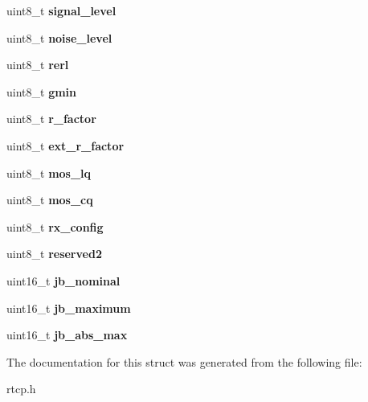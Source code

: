 \begin{DoxyCompactItemize}
\mbox{\label{structrtcp__xr__voip__metrics__report__block_a40740f7487e9b9ba71d17bf6ab461df1}} 
uint8\+\_\+t {\bfseries signal\+\_\+level}
\item 
\mbox{\label{structrtcp__xr__voip__metrics__report__block_a6b2963bd5447dfddf8432ba56293a480}} 
uint8\+\_\+t {\bfseries noise\+\_\+level}
\item 
\mbox{\label{structrtcp__xr__voip__metrics__report__block_a70714c668749ae16a89500399d5b93e5}} 
uint8\+\_\+t {\bfseries rerl}
\item 
\mbox{\label{structrtcp__xr__voip__metrics__report__block_aeb81ada01dcae55878cf3f0b2dd032f7}} 
uint8\+\_\+t {\bfseries gmin}
\item 
\mbox{\label{structrtcp__xr__voip__metrics__report__block_a900f98cc749e94e404e43276767cd3ad}} 
uint8\+\_\+t {\bfseries r\+\_\+factor}
\item 
\mbox{\label{structrtcp__xr__voip__metrics__report__block_aa1dba8d837317cc720ad7e98472c601d}} 
uint8\+\_\+t {\bfseries ext\+\_\+r\+\_\+factor}
\item 
\mbox{\label{structrtcp__xr__voip__metrics__report__block_ab0287887ef5f1a9769eceffd7ce5b9dd}} 
uint8\+\_\+t {\bfseries mos\+\_\+lq}
\item 
\mbox{\label{structrtcp__xr__voip__metrics__report__block_abd64eb340fe7288c37ba1c840d33cf92}} 
uint8\+\_\+t {\bfseries mos\+\_\+cq}
\item 
\mbox{\label{structrtcp__xr__voip__metrics__report__block_a4f977f294d2180ad049aa409dbea296a}} 
uint8\+\_\+t {\bfseries rx\+\_\+config}
\item 
\mbox{\label{structrtcp__xr__voip__metrics__report__block_a3a9b617f5673be1103c4ec4069e8141a}} 
uint8\+\_\+t {\bfseries reserved2}
\item 
\mbox{\label{structrtcp__xr__voip__metrics__report__block_a6d6b47b8eeb9b1ad3fe292f6ade0b4ca}} 
uint16\+\_\+t {\bfseries jb\+\_\+nominal}
\item 
\mbox{\label{structrtcp__xr__voip__metrics__report__block_a92b43b557b6a108bbbb62cf85b43427c}} 
uint16\+\_\+t {\bfseries jb\+\_\+maximum}
\item 
\mbox{\label{structrtcp__xr__voip__metrics__report__block_a1f2cea45e5a4dd6487cee9c48ce5b193}} 
uint16\+\_\+t {\bfseries jb\+\_\+abs\+\_\+max}
\end{DoxyCompactItemize}


The documentation for this struct was generated from the following file\+:\begin{DoxyCompactItemize}
\item 
rtcp.\+h\end{DoxyCompactItemize}
